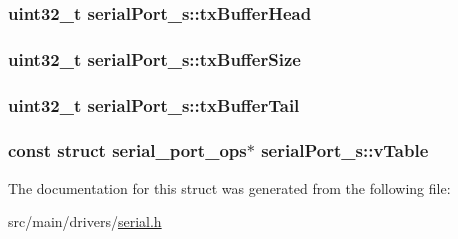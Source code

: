 \hypertarget{structserialPort__s_adf83f67cac7d47e0fa7608865e6074bc}{
\subsubsection[{tx\+Buffer\+Head}]{\setlength{\rightskip}{0pt plus 5cm}uint32\+\_\+t serial\+Port\+\_\+s\+::tx\+Buffer\+Head}}\label{structserialPort__s_adf83f67cac7d47e0fa7608865e6074bc}
\hypertarget{structserialPort__s_a867db18c473dfe7f276c158d19a70999}{
\subsubsection[{tx\+Buffer\+Size}]{\setlength{\rightskip}{0pt plus 5cm}uint32\+\_\+t serial\+Port\+\_\+s\+::tx\+Buffer\+Size}}\label{structserialPort__s_a867db18c473dfe7f276c158d19a70999}
\hypertarget{structserialPort__s_a1f1a7261e0b3d90e5771312ca6807dfc}{
\subsubsection[{tx\+Buffer\+Tail}]{\setlength{\rightskip}{0pt plus 5cm}uint32\+\_\+t serial\+Port\+\_\+s\+::tx\+Buffer\+Tail}}\label{structserialPort__s_a1f1a7261e0b3d90e5771312ca6807dfc}
\hypertarget{structserialPort__s_a34878c8792ffcb3ab7e259e08159e903}{
\subsubsection[{v\+Table}]{\setlength{\rightskip}{0pt plus 5cm}const struct {\bf serial\+\_\+port\+\_\+ops}$\ast$ serial\+Port\+\_\+s\+::v\+Table}}\label{structserialPort__s_a34878c8792ffcb3ab7e259e08159e903}


The documentation for this struct was generated from the following file\+:\begin{DoxyCompactItemize}
\item 
src/main/drivers/\hyperlink{drivers_2serial_8h}{serial.\+h}\end{DoxyCompactItemize}
